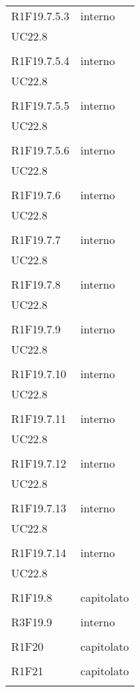 \begin{longtable}{ >{\centering}p{}
		>{\centering}p{}}
	R1F19.7.5.3 & interno\\UC22.8\\\tabularnewline
	
	R1F19.7.5.4 & interno\\UC22.8\\\tabularnewline
	
	R1F19.7.5.5 & interno\\UC22.8\\\tabularnewline
	
	R1F19.7.5.6 & interno\\UC22.8\\\tabularnewline
	
	R1F19.7.6 & interno\\UC22.8\\\tabularnewline
	
	R1F19.7.7 & interno\\UC22.8\\\tabularnewline
	
	R1F19.7.8 & interno\\UC22.8\\\tabularnewline
	
	R1F19.7.9 & interno\\UC22.8\\\tabularnewline
	
	R1F19.7.10 & interno\\UC22.8\\\tabularnewline
	
	R1F19.7.11 & interno\\UC22.8\\\tabularnewline
	
	R1F19.7.12 & interno\\UC22.8\\\tabularnewline
	
	R1F19.7.13 & interno\\UC22.8\\\tabularnewline
	
	R1F19.7.14 & interno\\UC22.8\\\tabularnewline
	
	R1F19.8 & capitolato\\\tabularnewline
	
	R3F19.9 & interno\\\tabularnewline
	
	R1F20 & capitolato\\\tabularnewline
	
	R1F21 & capitolato\\\tabularnewline
	

\end{longtable}
